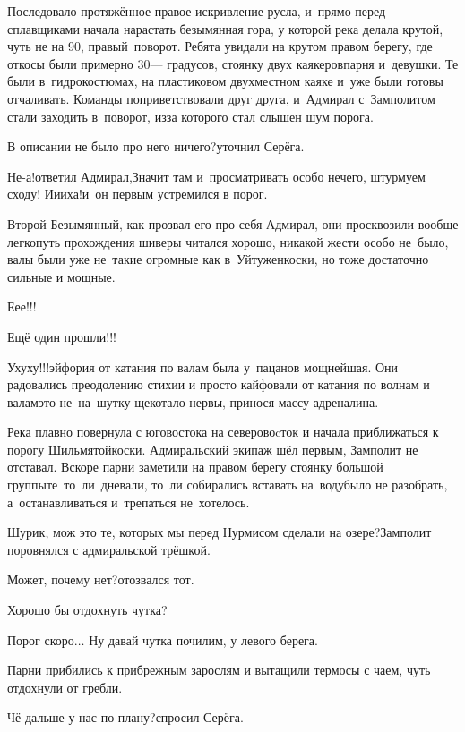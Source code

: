 Последовало протяжённое правое искривление русла, и~прямо перед сплавщиками начала нарастать безымянная гора, у которой река делала крутой, чуть не на 90\degree, правый~поворот. Ребята увидали на крутом правом берегу, где откосы были примерно 30\thinspace\nobreakdash--- градусов, стоянку двух каякеров\mdash парня и~девушки. Те были в~гидрокостюмах, на пластиковом двухместном каяке и~уже были готовы отчаливать. Команды поприветствовали друг друга, и~Адмирал с~Замполитом стали заходить в~поворот, из\sdash за которого стал слышен шум порога.

\diagdash В описании не было про него ничего?\mdash уточнил Серёга.

\diagdash Не-а!\mdash ответил Адмирал,\mdash Значит там и~просматривать особо нечего, штурмуем сходу! И\sdash и\sdash и\sdash ха!\mdash и~он первым устремился в порог.

Второй Безымянный, как прозвал его про себя Адмирал, они просквозили вообще легко\mdash путь прохождения шиверы читался хорошо, никакой жести особо не~было, валы были уже не~такие огромные как в~Уйтуженкоски, но тоже достаточно сильные и мощные.

\diagdash Е\sdash е\sdash е!!!

\diagdash Ещё один прошли!!!

\diagdash У\sdash ху\sdash ху!!!\mdash эйфория от катания по валам была у~пацанов мощнейшая. Они радовались преодолению стихии и просто кайфовали от катания по волнам и валам\mdash это не~на~шутку щекотало нервы, принося массу адреналина.

Река плавно повернула с юго\sdash востока на северо\sdash воcток и начала приближаться к порогу Шильмятойкоски. Адмиральский экипаж шёл первым, Замполит не отставал. Вскоре парни заметили на правом берегу стоянку большой группы\mdash те~то~ли~дневали, то~ли собирались вставать на~воду\mdash было не разобрать, а~останавливаться и~трепаться не~хотелось.

\diagdash Шурик, мож это те, которых мы перед Нурмисом сделали на озере?\mdash Замполит поровнялся с адмиральской трёшкой.

\diagdash Может, почему нет?\mdash отозвался тот.

\diagdash Хорошо бы отдохнуть чутка?

\diagdash Порог скоро$\ldots$ Ну давай чутка почилим, у левого берега.

Парни прибились к прибрежным зарослям и вытащили термосы с чаем, чуть отдохнули от гребли.

\diagdash Чё дальше у нас по плану?\mdash спросил Серёга.

